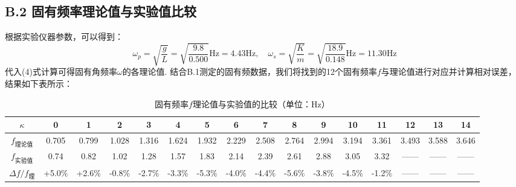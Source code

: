 \documentclass{ctexart}
\begin{document}
\subsection*{B.2 固有频率理论值与实验值比较}
\noindent 根据实验仪器参数，可以得到：
\begin{equation*}
  \omega_p=\sqrt{\frac{g}{L}}=\sqrt{\frac{9.8}{0.500}}\mathrm{Hz}=4.43\mathrm{Hz},\quad \omega_s=\sqrt{\frac{K}{m}}=\sqrt{\frac{18.9}{0.148}}\mathrm{Hz}=11.30\mathrm{Hz}
\end{equation*}
代入(4)式计算可得固有角频率$\omega$的各理论值. 结合B.1测定的固有频数据，我们将找到的12个固有频率$f$与理论值进行对应并计算相对误差，结果如下表所示：\\
\begin{table}[!htbp]
  \footnotesize
  \centering
  \caption{固有频率$f$理论值与实验值的比较（单位：Hz）}\vspace{0.3em} \label{tab:aStrangeTable}%
  \begin{tabular}{c|ccccccccccccccc}
  \toprule
   $\kappa$& 0&1& 2& 3& 4& 5& 6& 7& 8& 9& 10& 11& 12& 13& 14\\
  \midrule
    $f_{\text{理论值}}$& 0.705 &0.799& 1.028& 1.316& 1.624 &1.932 &2.229 &2.508 &2.764 &2.994 &3.194 &3.361 &3.493 &3.588& 3.646\\
    $f_{\text{实验值}}$& 0.74  &0.82 & 1.02 & 1.28 & 1.57  &1.83  &2.14  &2.39  &2.61  &2.88  &3.05  &3.32  & ——     & ——   & ——  \\
    $\Delta f/f_{\text{理}}$& +5.0\% &+2.6\% & -0.8\% & -2.7\% & -3.3\% & -5.3\% & -4.0\% & -4.4\% & -5.6\% & -3.8\% & -4.5\% & -1.2\% & —— & —— & ——\\
  \bottomrule
  \end{tabular}
  \end{table}
\end{document}
